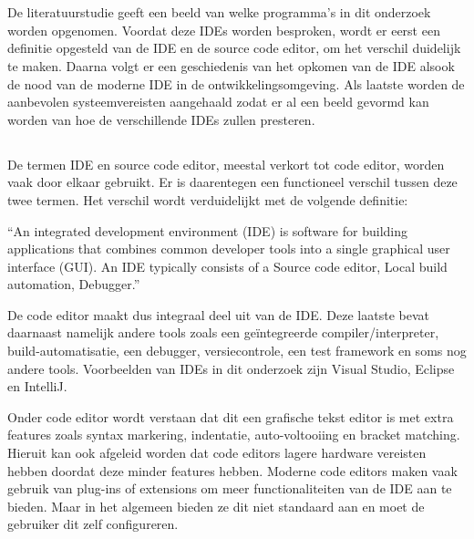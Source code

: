 \chapter{}
\label{ch:stand-van-zaken}



De literatuurstudie geeft een beeld van welke programma’s in dit onderzoek worden opgenomen. Voordat deze IDEs worden besproken, wordt er eerst een definitie opgesteld van de IDE en de source code editor, om het verschil duidelijk te maken. Daarna volgt er een geschiedenis van het opkomen van de IDE alsook de nood van de moderne IDE in de ontwikkelingsomgeving. Als laatste worden de aanbevolen systeemvereisten aangehaald zodat er al een beeld gevormd kan worden van hoe de verschillende IDEs zullen presteren.

\section{}
\label{sec:IDE-codeEditor}

De termen IDE en source code editor, meestal verkort tot code editor, worden vaak door elkaar gebruikt. Er is daarentegen een functioneel verschil tussen deze twee termen. Het verschil wordt verduidelijkt met de volgende definitie:

“An integrated development environment (IDE) is software for building applications that combines common developer tools into a single graphical user interface (GUI). An IDE typically consists of a Source code editor,  Local build automation, Debugger.” \autocite{RedHat2018}

De code editor maakt dus integraal deel uit van de IDE. Deze laatste bevat daarnaast namelijk andere tools zoals een geïntegreerde compiler/interpreter, build-automatisatie, een debugger, versiecontrole, een test framework en soms nog andere tools. Voorbeelden van IDEs in dit onderzoek zijn Visual Studio, Eclipse en IntelliJ.

Onder code editor wordt verstaan dat dit een grafische tekst editor is met extra features zoals syntax markering, indentatie, auto-voltooiing en bracket matching. Hieruit kan ook afgeleid worden dat code editors lagere hardware vereisten hebben doordat deze minder features hebben. Moderne code editors maken vaak gebruik van plug-ins of extensions om meer functionaliteiten van de IDE aan te bieden. Maar in het algemeen bieden ze dit niet standaard aan en moet de gebruiker dit zelf configureren.

